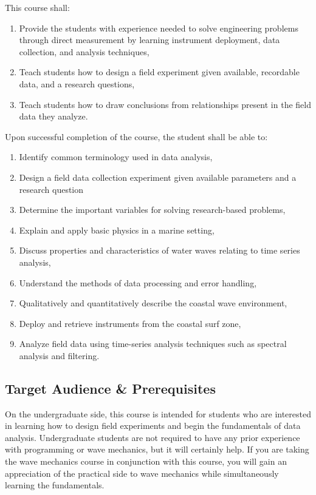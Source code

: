 \documentclass[
	letterpaper, %
	fontsize=10pt, %
	twoside=true, %
	numbers=noenddot, %
]{kaobook}
\begin{document}
This course shall:
\begin{enumerate}
    \item Provide the students with experience needed to solve engineering problems through direct measurement by learning instrument deployment, data collection, and analysis techniques,
    \item Teach students how to design a field experiment given available, recordable data, and a research questions,
    \item Teach students how to draw conclusions from relationships present in the field data they analyze.
\end{enumerate}

Upon successful completion of the course, the student shall be able to:
\begin{enumerate}
    \item Identify common terminology used in data analysis,
    \item Design a field data collection experiment given available parameters and a research question
    \item Determine the important variables for solving research-based problems,
    \item Explain and apply basic physics in a marine setting,
    \item Discuss properties and characteristics of water waves relating to time series analysis,
    \item Understand the methods of data processing and error handling,
    \item Qualitatively and quantitatively describe the coastal wave environment,
    \item Deploy and retrieve instruments from the coastal surf zone,
    \item Analyze field data using time-series analysis techniques such as spectral analysis and filtering.
\end{enumerate}

\subsection*{Target Audience \& Prerequisites} \label{ssec:target_audience_prereqs}
On the undergraduate side, this course is intended for students who are interested in learning how to design field experiments and begin the fundamentals of data analysis.
Undergraduate students are not required to have any prior experience with programming or wave mechanics, but it will certainly help.
If you are taking the wave mechanics course in conjunction with this course, you will gain an appreciation of the practical side to wave mechanics while simultaneously learning the fundamentals.
\end{document}
